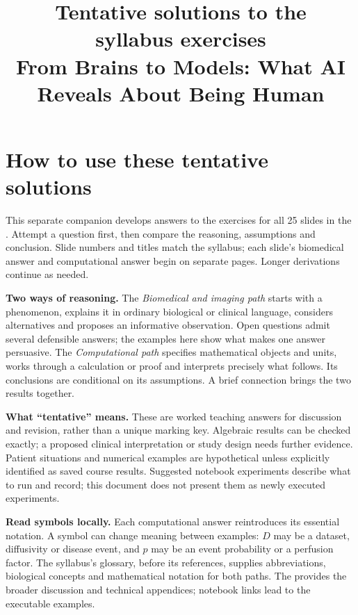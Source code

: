 \documentclass[11pt,a4paper]{article}
\title{\textbf{Tentative solutions to the\\syllabus exercises}\\[5mm]\large From Brains to Models: What AI Reveals About Being Human}
\author{\courseauthor}
\date{\coursedate}
\newcommand{\currentsolutionheading}{Tentative syllabus solutions}
\begin{document}
\maketitle
\section*{How to use these tentative solutions}
This separate companion develops answers to the exercises for all 25 slides in the . Attempt a question first, then compare the reasoning, assumptions and conclusion. Slide numbers and titles match the syllabus; each slide's biomedical answer and computational answer begin on separate pages. Longer derivations continue as needed.

\textbf{Two ways of reasoning.} The \emph{Biomedical and imaging path} starts with a phenomenon, explains it in ordinary biological or clinical language, considers alternatives and proposes an informative observation. Open questions admit several defensible answers; the examples here show what makes one answer persuasive. The \emph{Computational path} specifies mathematical objects and units, works through a calculation or proof and interprets precisely what follows. Its conclusions are conditional on its assumptions. A brief connection brings the two results together.

\textbf{What ``tentative'' means.} These are worked teaching answers for discussion and revision, rather than a unique marking key. Algebraic results can be checked exactly; a proposed clinical interpretation or study design needs further evidence. Patient situations and numerical examples are hypothetical unless explicitly identified as saved course results. Suggested notebook experiments describe what to run and record; this document does not present them as newly executed experiments.

\textbf{Read symbols locally.} Each computational answer reintroduces its essential notation. A symbol can change meaning between examples: $D$ may be a dataset, diffusivity or disease event, and $p$ may be an event probability or a perfusion factor. The syllabus's glossary, before its references, supplies abbreviations, biological concepts and mathematical notation for both paths. The  provides the broader discussion and technical appendices; notebook links lead to the executable examples.

\clearpage
\begingroup\small
\makeatletter\let\l@section\l@subsection\makeatother
\tableofcontents\endgroup





\clearpage
\gdef\currentsolutionheading{Sources and follow-up}
\end{document}
